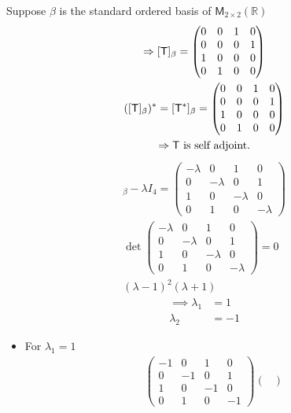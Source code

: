 \begin{enumerate}
Suppose $\beta$ is the standard ordered basis of $\mathsf{M}_{2 \times
  2}(\mathbb{R})$
\begin{gather}
\implies [\mathsf{T}]_\beta = \begin{pmatrix}
0 & 0 & 1 & 0\\
0 & 0 & 0 & 1\\
1 & 0 & 0 & 0\\
0 & 1 & 0 & 0
\end{pmatrix}\\
([\mathsf{T}]_\beta)^* = [\mathsf{T}^*]_\beta = \begin{pmatrix}
0 & 0 & 1 & 0\\
0 & 0 & 0 & 1\\
1 & 0 & 0 & 0\\
0 & 1 & 0 & 0
\end{pmatrix}\\
\implies \mathsf{T} \text{ is self adjoint.} \notag
\end{gather}
\begin{gather}
[\mathsf{T}]_\beta - \lambda I_4 = \begin{pmatrix}
-\lambda & 0 & 1 & 0\\
0 & -\lambda & 0 & 1\\
1 & 0 & -\lambda & 0\\
0 & 1 & 0 & -\lambda
\end{pmatrix}\\
\det{
\begin{pmatrix}
-\lambda & 0 & 1 & 0\\
0 & -\lambda & 0 & 1\\
1 & 0 & -\lambda & 0\\
0 & 1 & 0 & -\lambda
\end{pmatrix}
}=0\\
(\lambda-1)^2(\lambda +1)
\end{gather}
\begin{align}
\implies \lambda_1 &= 1\\
\lambda_2 &= -1
\end{align}
\begin{itemize}
\item For $\lambda_1 = 1$
\begin{gather}
\begin{pmatrix}
-1 & 0 & 1 & 0\\
0 & -1 & 0 & 1\\
1 & 0 & -1 & 0\\
0 & 1 & 0 & -1
\end{pmatrix}
\begin{pmatrix}

\end{pmatrix}
\end{gather}
\end{itemize}
\end{enumerate}
